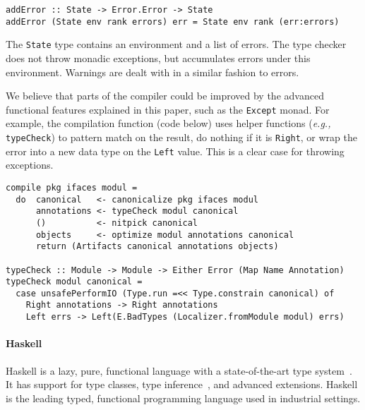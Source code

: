 \documentclass[sigplan,screen]{acmart}
\begin{document}
\begin{minipage}[t]{\linewidth}
\begin{lstlisting}[style=encore]
addError :: State -> Error.Error -> State
addError (State env rank errors) err = State env rank (err:errors)
\end{lstlisting}
\end{minipage}

The \texttt{State} type contains an environment and a list of errors. The type checker does
not throw monadic exceptions, but accumulates errors under this environment.
Warnings are dealt with in a similar fashion to errors.

We believe that parts of the compiler could be improved by the advanced functional features
explained in this paper, such as the \texttt{Except} monad.
For example, the compilation function (code below) uses helper functions
(\textit{e.g.,} \texttt{typeCheck}) to pattern match on the result, do nothing if it
is \texttt{Right}, or wrap the error into a new data type on the
\texttt{Left} value. This is a clear case for throwing exceptions.

\begin{minipage}[t]{\linewidth}
\begin{lstlisting}[style=encore]
compile pkg ifaces modul =
  do  canonical   <- canonicalize pkg ifaces modul
      annotations <- typeCheck modul canonical
      ()          <- nitpick canonical
      objects     <- optimize modul annotations canonical
      return (Artifacts canonical annotations objects)

typeCheck :: Module -> Module -> Either Error (Map Name Annotation)
typeCheck modul canonical =
  case unsafePerformIO (Type.run =<< Type.constrain canonical) of
    Right annotations -> Right annotations
    Left errs -> Left(E.BadTypes (Localizer.fromModule modul) errs)
\end{lstlisting}
\end{minipage}

\paragraph{Haskell}

Haskell is a lazy, pure, functional language with a state-of-the-art type system~\cite{HaskellReport}.
It has support for type classes, type inference~\cite{haskellInference}, and advanced extensions.
Haskell is the leading typed, functional programming language used in industrial settings.
\end{document}
